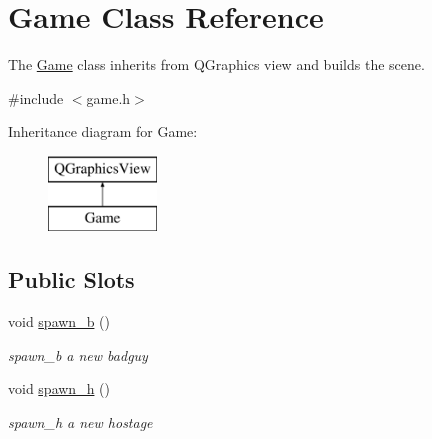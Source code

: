 \hypertarget{class_game}{}\section{Game Class Reference}
\label{class_game}


The \hyperlink{class_game}{Game} class inherits from Q\+Graphics view and builds the scene.  




{\ttfamily \#include $<$game.\+h$>$}

Inheritance diagram for Game\+:\begin{figure}[H]
\begin{center}
\leavevmode
\includegraphics[height=2.000000cm]{class_game}
\end{center}
\end{figure}
\subsection*{Public Slots}
\begin{DoxyCompactItemize}
\item 
\hypertarget{class_game_af3f86c072631ccffc1e3de01bdfd1b88}{}void \hyperlink{class_game_af3f86c072631ccffc1e3de01bdfd1b88}{spawn\+\_\+b} ()\label{class_game_af3f86c072631ccffc1e3de01bdfd1b88}

\begin{DoxyCompactList}\small\item\em spawn\+\_\+b  a new badguy \end{DoxyCompactList}\item 
\hypertarget{class_game_a46fe3c9b6eb40e67d292b71345a5583b}{}void \hyperlink{class_game_a46fe3c9b6eb40e67d292b71345a5583b}{spawn\+\_\+h} ()\label{class_game_a46fe3c9b6eb40e67d292b71345a5583b}

\begin{DoxyCompactList}\small\item\em spawn\+\_\+h  a new hostage \end{DoxyCompactList}\end{DoxyCompactItemize}
